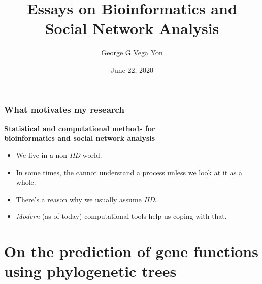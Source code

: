 \documentclass[aspectratio=169, 9pt, handout]{beamer}
\title[Stat. Comp. for Complex Systems]{Essays on Bioinformatics and
Social Network Analysis
\linebreak{\small Statistical and Computational Methods for
Complex Systems}}
\author[GGVY]{George G Vega Yon}
\institute[USC-PREVMED]{University of Southern California, Department of Preventive Medicine}
\date{June 22, 2020}
\begin{document}
\begin{frame}%
\maketitle
\end{frame}

\begin{frame}
\frametitle{What motivates my research}

\begin{center}
\large
\textcolor{usccardinal}{\bf Statistical and computational methods for\\ %
bioinformatics and social network analysis}
\end{center}

\begin{itemize}[<+->]
\item We live in a non-{\it IID} world.
\item In some times, the cannot understand a process unless we look at it as a whole.
\item There's a reason why we usually assume {\it IID}.
\item {\it Modern} (as of today) computational tools help us coping with that.
\end{itemize}
\end{frame}



\section{On the prediction of gene functions using phylogenetic trees}

\end{document}
